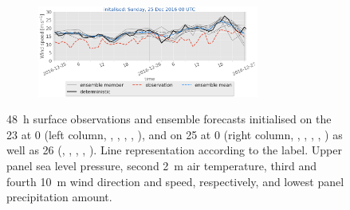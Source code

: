 \begin{figure}[H]
	\begin{subfigure}[b]{\textwidth}
		\centering
		\includegraphics[trim={5.5cm 0cm 5.cm 17.2cm},clip,
		width=0.8\textwidth]{./fig_sfc_ws/20161225_00}
	\end{subfigure}
	\caption{\SI{48}{\hour} surface observations and ensemble forecasts initialised on the \SI{23}{\dec} at \SI{0}{\UTC} (left column, \protect{}, \protect{}, \protect{}, \protect{}, \protect{}), and on \SI{25}{\dec} at \SI{0}{\UTC} (right column, \protect{}, \protect{}, \protect{}, \protect{}, \protect{}) as well as \SI{26}{\dec} (\protect{}, \protect{}, \protect{}, \protect{}, \protect{}). Line representation according to the label. Upper panel sea level pressure, second \SI{2}{\metre} air temperature, third and fourth \SI{10}{\metre} wind direction and speed, respectively, and lowest panel precipitation amount. }\label{fig:res:sfc_obs_meps}
\end{figure}
